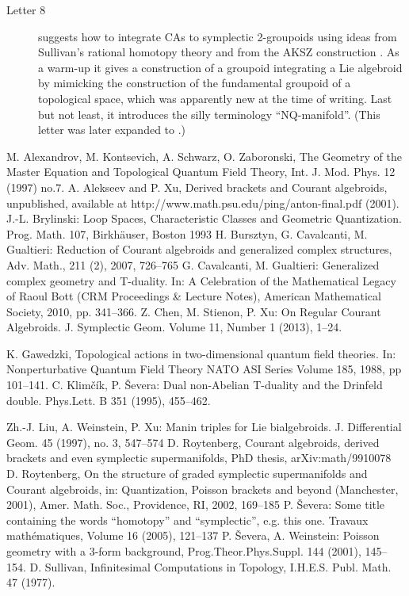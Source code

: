 \documentclass{article}
\begin{document}
\begin{description}
\item[Letter 8] suggests how to integrate CAs to symplectic 2-groupoids using ideas from Sullivan's rational homotopy theory \cite{Sul} and from the AKSZ construction \cite{AKSZ}. As a warm-up it gives a construction of a groupoid integrating a Lie algebroid by mimicking the construction of the fundamental groupoid of a topological space, which was apparently new at the time of writing. Last but not least, it introduces the silly terminology ``NQ-manifold''. (This letter was later expanded to \cite{some}.)
\end{description}

\begin{thebibliography}{9}
M. Alexandrov, M. Kontsevich, A. Schwarz, O. Zaboronski, The Geometry
of the Master Equation and Topological Quantum Field Theory, Int.
J. Mod. Phys. 12 (1997) no.7.
A. Alekseev and P. Xu, Derived brackets and Courant algebroids, unpublished, available at
http://www.math.psu.edu/ping/anton-final.pdf (2001).
J.-L. Brylinski: Loop Spaces, Characteristic Classes and Geometric Quantization. Prog. Math. 107, Birkhäuser, Boston 1993
 H. Bursztyn, G. Cavalcanti, M. Gualtieri: Reduction of Courant algebroids and generalized complex structures, Adv. Math., 211 (2), 2007, 726--765
G. Cavalcanti, M. Gualtieri: Generalized complex geometry and T-duality. In: A Celebration of the Mathematical Legacy of Raoul Bott (CRM Proceedings \& Lecture Notes), American Mathematical Society, 2010, pp. 341--366.
 Z. Chen, M. Stienon, P. Xu: On Regular Courant Algebroids. J. Symplectic Geom.
Volume 11, Number 1 (2013), 1--24.

 K. Gawedzki, Topological actions in two-dimensional quantum field theories. In: Nonperturbative Quantum Field Theory
NATO ASI Series Volume 185, 1988, pp 101--141.
 C. Klimčík, P. Ševera: Dual non-Abelian T-duality and the Drinfeld double. Phys.Lett. B 351 (1995), 455--462.


 Zh.-J. Liu, A. Weinstein, P. Xu: Manin triples for Lie bialgebroids. J. Differential Geom. 45 (1997), no. 3,
547–574
 D. Roytenberg, Courant algebroids, derived brackets and even symplectic supermanifolds, PhD thesis, arXiv:math/9910078
 D. Roytenberg, On the structure of graded symplectic supermanifolds and Courant algebroids, in: Quantization,
Poisson brackets and beyond (Manchester, 2001), Amer. Math. Soc., Providence, RI, 2002, 169--185
 P. Ševera: Some title containing the words “homotopy” and
“symplectic”, e.g. this one. Travaux mathématiques, Volume 16 (2005), 121--137
P. \v Severa, A. Weinstein: Poisson geometry with a 3-form background, Prog.Theor.Phys.Suppl. 144 (2001), 145--154.
D. Sullivan, Infinitesimal Computations in Topology, I.H.E.S. Publ.
Math. 47 (1977).


\end{thebibliography}
\end{document}
